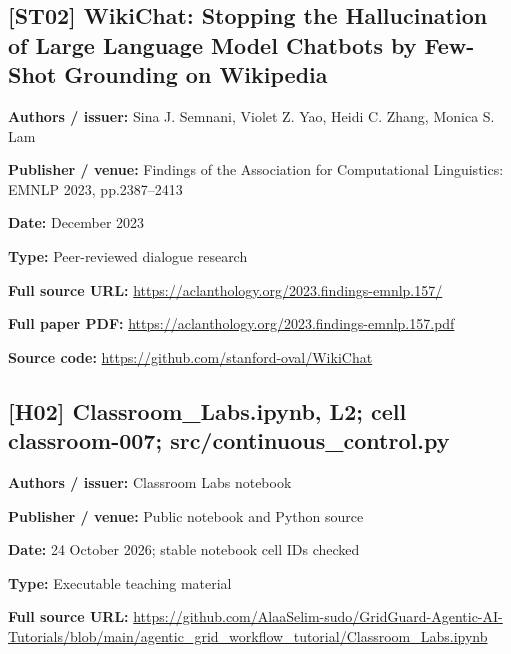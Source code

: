 \documentclass[10pt,letterpaper]{article}
\begin{document}
\subsection*{[ST02] WikiChat: Stopping the Hallucination of Large Language Model Chatbots by Few-Shot Grounding on Wikipedia}
\textbf{Authors / issuer:} Sina J. Semnani, Violet Z. Yao, Heidi C. Zhang, Monica S. Lam\par
\textbf{Publisher / venue:} Findings of the Association for Computational Linguistics: EMNLP 2023, pp.2387--2413\par
\textbf{Date:} December 2023\par
\textbf{Type:} Peer-reviewed dialogue research\par
\textbf{Full source URL:} \href{https://aclanthology.org/2023.findings-emnlp.157/}{\small\ttfamily https:/\allowbreak{}/\allowbreak{}aclanthology.\allowbreak{}org/\allowbreak{}2023.\allowbreak{}findings-\allowbreak{}emnlp.\allowbreak{}157/\allowbreak{}}\par
\textbf{Full paper PDF:} \href{https://aclanthology.org/2023.findings-emnlp.157.pdf}{\small\ttfamily https:/\allowbreak{}/\allowbreak{}aclanthology.\allowbreak{}org/\allowbreak{}2023.\allowbreak{}findings-\allowbreak{}emnlp.\allowbreak{}157.\allowbreak{}pdf}\par
\textbf{Source code:} \href{https://github.com/stanford-oval/WikiChat}{\small\ttfamily https:/\allowbreak{}/\allowbreak{}github.\allowbreak{}com/\allowbreak{}stanford-\allowbreak{}oval/\allowbreak{}WikiChat}\par
\par\medskip
\subsection*{[H02] Classroom\_Labs.ipynb, L2; cell classroom-007; src/continuous\_control.py}
\textbf{Authors / issuer:} Classroom Labs notebook\par
\textbf{Publisher / venue:} Public notebook and Python source\par
\textbf{Date:} 24 October 2026; stable notebook cell IDs checked\par
\textbf{Type:} Executable teaching material\par
\textbf{Full source URL:} \href{https://github.com/AlaaSelim-sudo/GridGuard-Agentic-AI-Tutorials/blob/main/agentic_grid_workflow_tutorial/Classroom_Labs.ipynb}{\small\ttfamily https:/\allowbreak{}/\allowbreak{}github.\allowbreak{}com/\allowbreak{}AlaaSelim-\allowbreak{}sudo/\allowbreak{}GridGuard-\allowbreak{}Agentic-\allowbreak{}AI-\allowbreak{}Tutorials/\allowbreak{}blob/\allowbreak{}main/\allowbreak{}agentic\_\allowbreak{}grid\_\allowbreak{}workflow\_\allowbreak{}tutorial/\allowbreak{}Classroom\_\allowbreak{}Labs.\allowbreak{}ipynb}\par
\par\medskip
\end{document}
